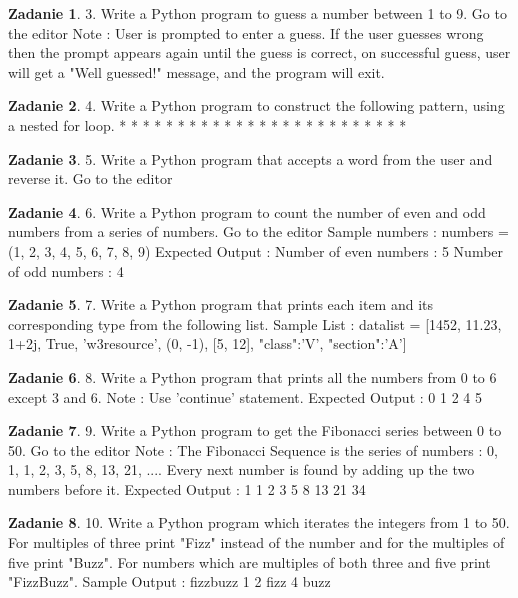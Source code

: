 \documentclass[11pt]{article}
\theoremstyle{definition}
\newtheorem{zadanie}{Zadanie}
\begin{document}
\begin{zadanie}
3. Write a Python program to guess a number between 1 to 9. Go to the editor
Note : User is prompted to enter a guess. If the user guesses wrong then the prompt appears again until the guess is correct, on successful guess, user will get a "Well guessed!" message, and the program will exit.
\end{zadanie}

\begin{zadanie}
4. Write a Python program to construct the following pattern, using a nested for loop.
*
* *
* * *
* * * *
* * * * *
* * * *
* * *
* *
*
\end{zadanie}

\begin{zadanie}
5. Write a Python program that accepts a word from the user and reverse it. Go to the editor
\end{zadanie}

\begin{zadanie}
6. Write a Python program to count the number of even and odd numbers from a series of numbers. Go to the editor
Sample numbers : numbers = (1, 2, 3, 4, 5, 6, 7, 8, 9)
Expected Output :
Number of even numbers : 5
Number of odd numbers : 4
\end{zadanie}

\begin{zadanie}
7. Write a Python program that prints each item and its corresponding type from the following list.
Sample List : datalist = [1452, 11.23, 1+2j, True, 'w3resource', (0, -1), [5, 12], {"class":'V', "section":'A'}]
\end{zadanie}

\begin{zadanie}
8. Write a Python program that prints all the numbers from 0 to 6 except 3 and 6.
Note : Use 'continue' statement.
Expected Output : 0 1 2 4 5
\end{zadanie}

\begin{zadanie}
9. Write a Python program to get the Fibonacci series between 0 to 50. Go to the editor
Note : The Fibonacci Sequence is the series of numbers :
0, 1, 1, 2, 3, 5, 8, 13, 21, ....
Every next number is found by adding up the two numbers before it.
Expected Output : 1 1 2 3 5 8 13 21 34
\end{zadanie}

\begin{zadanie}
10. Write a Python program which iterates the integers from 1 to 50. For multiples of three print "Fizz" instead of the number and for the multiples of five print "Buzz". For numbers which are multiples of both three and five print "FizzBuzz".
Sample Output :
fizzbuzz
1
2
fizz
4
buzz
\end{zadanie}
\end{document}
